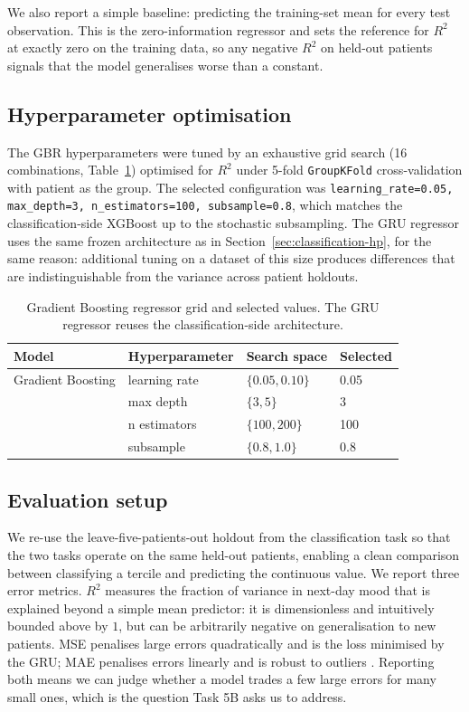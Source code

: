 We also report a simple baseline: predicting the training-set mean for every test observation. This is the zero-information regressor and sets the reference for $R^2$ at exactly zero on the training data, so any negative $R^2$ on held-out patients signals that the model generalises worse than a constant.

\subsection{Hyperparameter optimisation}\label{sec:regression-hp}

The GBR hyperparameters were tuned by an exhaustive grid search (16 combinations, Table~\ref{tab:gbr-grid}) optimised for $R^2$ under 5-fold \texttt{GroupKFold} cross-validation with patient as the group. The selected configuration was \texttt{learning\_rate=0.05, max\_depth=3, n\_estimators=100, subsample=0.8}, which matches the classification-side XGBoost up to the stochastic subsampling. The GRU regressor uses the same frozen architecture as in Section~\ref{sec:classification-hp}, for the same reason: additional tuning on a dataset of this size produces differences that are indistinguishable from the variance across patient holdouts.

\begin{table}[h]
\centering
\caption{Gradient Boosting regressor grid and selected values. The GRU regressor reuses the classification-side architecture.}
\label{tab:gbr-grid}
\small
\begin{tabular}{@{}llp{4.5cm}l@{}}
\toprule
Model & Hyperparameter & Search space & Selected \\
\midrule
Gradient Boosting & learning rate & $\{0.05, 0.10\}$ & 0.05 \\
 & max depth & $\{3, 5\}$ & 3 \\
 & n estimators & $\{100, 200\}$ & 100 \\
 & subsample & $\{0.8, 1.0\}$ & 0.8 \\
\bottomrule
\end{tabular}
\end{table}

\subsection{Evaluation setup}\label{sec:regression-eval}

We re-use the leave-five-patients-out holdout from the classification task so that the two tasks operate on the same held-out patients, enabling a clean comparison between classifying a tercile and predicting the continuous value. We report three error metrics. $R^2$ measures the fraction of variance in next-day mood that is explained beyond a simple mean predictor: it is dimensionless and intuitively bounded above by $1$, but can be arbitrarily negative on generalisation to new patients. MSE penalises large errors quadratically and is the loss minimised by the GRU; MAE penalises errors linearly and is robust to outliers \cite{willmott2005advantages}. Reporting both means we can judge whether a model trades a few large errors for many small ones, which is the question Task 5B asks us to address.

